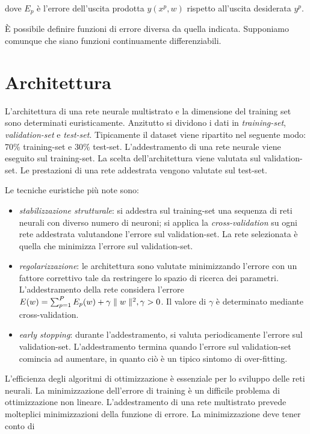 dove $E_{p}$ è l'errore dell'uscita prodotta $y(x^{p},w)$ rispetto all'uscita desiderata $y^{p}$.

È possibile definire funzioni di errore diversa da quella indicata. Supponiamo comunque che siano funzioni continuamente differenziabili.


\section{Architettura}
\label{neural-networks.multilayered.architecture}
L'architettura di una rete neurale multistrato e la dimensione del training set sono determinati euristicamente.
Anzitutto si dividono i dati in \textit{training-set}, \textit{validation-set} e \textit{test-set}. Tipicamente il dataset viene ripartito nel seguente modo: 70\% training-set e 30\% test-set. L'addestramento di una rete neurale viene eseguito sul training-set. La scelta dell'architettura viene valutata sul validation-set. Le prestazioni di una rete addestrata vengono valutate sul test-set.

Le tecniche euristiche più note sono:

\begin{itemize}
  \item \textit{stabilizzazione strutturale}: si addestra sul training-set una sequenza di reti neurali con diverso numero di neuroni; si applica la \textit{cross-validation} su ogni rete addestrata valutandone l'errore sul validation-set. La rete selezionata è quella che minimizza l'errore sul validation-set.

  \item \textit{regolarizzazione}: le architettura sono valutate minimizzando l'errore con un fattore correttivo tale da restringere lo spazio di ricerca dei parametri. L'addestramento della rete considera l'errore $E(w)=\sum_{p=1}^{P}E_{p}(w)+\gamma\parallel w \parallel^{2},\gamma>0$. Il valore di $\gamma$ è determinato mediante cross-validation.

  \item \textit{early stopping}: durante l'addestramento, si valuta periodicamente l'errore sul validation-set. L'addestramento termina quando l'errore sul validation-set comincia ad aumentare, in quanto ciò è un tipico sintomo di over-fitting.
\end{itemize}

L'efficienza degli algoritmi di ottimizzazione è essenziale per lo sviluppo delle reti neurali. La minimizzazione dell'errore di training è un difficile problema di ottimizzazione non lineare. L'addestramento di una rete multistrato prevede molteplici minimizzazioni della funzione di errore. La minimizzazione deve tener conto di

